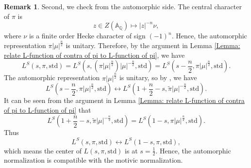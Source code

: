 \documentclass[11pt, a4paper]{amsart}
\theoremstyle{plain}
\theoremstyle{definition}
\newtheorem{remark}[theorem]{Remark}
\numberwithin{equation}{section}
\def\AAA{\mathbb{A}}
\def\QQ{\mathbb{Q}}
\begin{document}
\begin{remark}
    \par Second, we check from the automorphic side. 
    The central character of $\pi$ is 
    \begin{equation*}
        z \in Z(\AAA_\QQ) \mapsto |z|^{-n} \nu, 
    \end{equation*}
    where $\nu$ is a finite order Hecke character of sign $(-1)^{n}$. Hence, the automorphic representation $\pi |\mu|^{\frac{n}{2}}$ is unitary. 
    Therefore, by the argument in Lemma \ref{Lemma: relate L-function of contra of pi to L-function of pi}, we have 
    \begin{equation*}
        L^{S}(s, \pi, \mathrm{std}) = L^{S}(s, (\pi|\mu|^{\frac{n}{2}})|\mu|^{-\frac{n}{2}}, \mathrm{std}) = L^{S}\left(s - \frac{n}{2}, \pi|\mu|^{\frac{n}{2}}, \mathrm{std}\right). 
    \end{equation*}
    The automorphic representation $\pi|\mu|^{\frac{n}{2}}$ is unitary, so by \cite[(5.1), P163]{Gelbart&PS84}, we have 
    \begin{equation*}
        L^{S}\left(s - \frac{n}{2}, \pi|\mu|^{\frac{n}{2}}, \mathrm{std}\right) \leftrightarrow L^{S}\left(1 + \frac{n}{2} - s, \tilde{\pi}|\mu|^{-\frac{n}{2}}, \mathrm{std}\right). 
    \end{equation*}
    It can be seen from the  argument in Lemma \ref{Lemma: relate L-function of contra of pi to L-function of pi} that 
    \begin{equation*}
        L^{S}\left(1 + \frac{n}{2} - s, \tilde{\pi}|\mu|^{-\frac{n}{2}}, \mathrm{std}\right) = L^{S}(1  - s, \pi|\mu|^{\frac{n}{2}}, \mathrm{std}).
    \end{equation*}
    Thus
    \begin{equation}
         L^{S}(s, \pi, \mathrm{std}) \leftrightarrow  L^{S}(1 - s, \pi, \mathrm{std}),
    \end{equation}
    which means the center of $L(s, \pi, \mathrm{std})$ is at $s = \frac{1}{2}$. Hence, the automorphic normalization is compatible with the motivic normalization. 
\end{remark}
\end{document}
